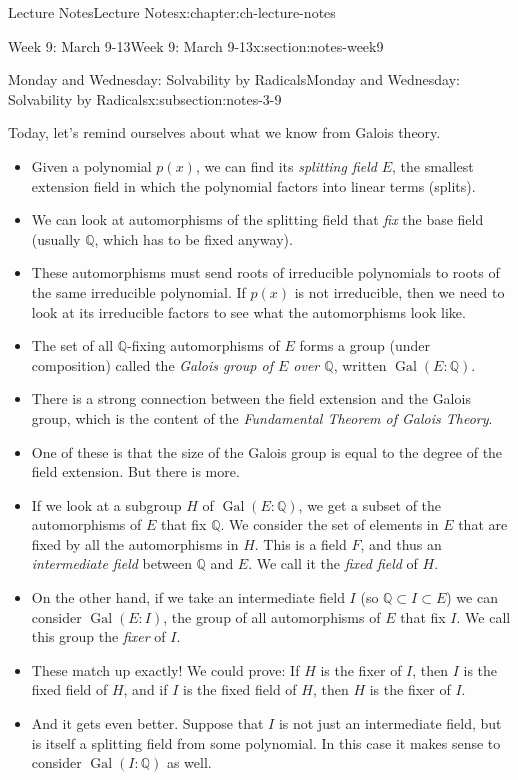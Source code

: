 \documentclass[oneside,11pt,]{book}
\begin{document}
\begin{chapterptx}{Lecture Notes}{}{Lecture Notes}{}{}{x:chapter:ch-lecture-notes}
\begin{sectionptx}{Week 9: March 9-13}{}{Week 9: March 9-13}{}{}{x:section:notes-week9}
\begin{subsectionptx}{Monday and Wednesday: Solvability by Radicals}{}{Monday and Wednesday: Solvability by Radicals}{}{}{x:subsection:notes-3-9}
\par
Today, let’s remind ourselves about what we know from Galois theory.%
\par
%
\begin{itemize}[label=\textbullet]
\item{}Given a polynomial \(p(x)\), we can find its \emph{splitting field} \(E\), the smallest extension field in which the polynomial factors into linear terms (splits).%
\item{}We can look at automorphisms of the splitting field that \emph{fix} the base field (usually \(\mathbb Q\), which has to be fixed anyway).%
\item{}These automorphisms must send roots of irreducible polynomials to roots of the same irreducible polynomial. If \(p(x)\) is not irreducible, then we need to look at its irreducible factors to see what the automorphisms look like.%
\item{}The set of all \(\mathbb Q\)-fixing automorphisms of \(E\) forms a group (under composition) called the \emph{Galois group of \(E\) over \(\mathbb Q\)}, written \(\mathop{\mathrm{Gal}}(E:\mathbb Q)\).%
\item{}There is a strong connection between the field extension and the Galois group, which is the content of the \emph{Fundamental Theorem of Galois Theory}.%
\item{}One of these is that the size of the Galois group is equal to the degree of the field extension. But there is more.%
\item{}If we look at a subgroup \(H\) of \(\mathop{\mathrm{Gal}}(E:\mathbb Q)\), we get a subset of the automorphisms of \(E\) that fix \(\mathbb Q\). We consider the set of elements in \(E\) that are fixed by all the automorphisms in \(H\). This is a field \(F\), and thus an \emph{intermediate field} between \(\mathbb Q\) and \(E\). We call it the \emph{fixed field} of \(H\).%
\item{}On the other hand, if we take an intermediate field \(I\) (so \(\mathbb Q\subset I \subset E\)) we can consider \(\mathop{\mathrm{Gal}}(E:I)\), the group of all automorphisms of \(E\) that fix \(I\). We call this group the \emph{fixer} of \(I\).%
\item{}These match up exactly! We could prove: If \(H\) is the fixer of \(I\), then \(I\) is the fixed field of \(H\), and if \(I\) is the fixed field of \(H\), then \(H\) is the fixer of \(I\).%
\item{}And it gets even better. Suppose that \(I\) is not just an intermediate field, but is itself a splitting field from some polynomial. In this case it makes sense to consider \(\mathop{\mathrm{Gal}}(I:\mathbb Q)\) as well.%

\end{itemize}
\end{subsectionptx}
\end{sectionptx}
\end{chapterptx}
\end{document}
